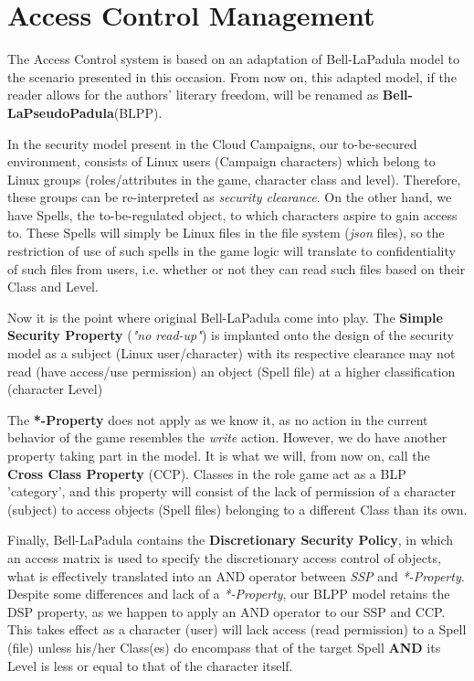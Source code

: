 \documentclass[a4paper,12pt]{report}
\begin{document}
\section{Access Control Management}
\label{sec:planACL}
The Access Control system is based on an adaptation of Bell-LaPadula model to the scenario presented in this occasion. From now on, this adapted model, if the reader allows for the authors' literary freedom, will be renamed as \textbf{Bell-LaPseudoPadula}(BLPP).

In the security model present in the Cloud Campaigns, our to-be-secured environment, consists of Linux users (Campaign characters) which belong to Linux groups (roles/attributes in the game, character class and level). Therefore, these groups can be re-interpreted as \textit{security clearance}.
On the other hand, we have Spells, the to-be-regulated object, to which characters aspire to gain access to. These Spells will simply be Linux files in the file system (\textit{json} files), so the restriction of use of such spells in the game logic will translate to confidentiality of such files from users, i.e. whether or not they can read such files based on their Class and Level.

Now it is the point where original Bell-LaPadula come into play. The \textbf{Simple Security Property} (\textit{"no read-up"}) is implanted onto the design of the security model as a subject (Linux user/character) with its respective clearance may not read (have access/use permission) an object (Spell file) at a higher classification (character Level)

The \textbf{*-Property} does not apply as we know it, as no action in the current behavior of the game resembles the \textit{write} action. However, we do have another property taking part in the model. It is what we will, from now on, call the \textbf{Cross Class Property} (CCP). Classes in the role game act as a BLP 'category', and this property will consist of the lack of permission of a character (subject) to access objects (Spell files) belonging to a different Class than its own.

Finally, Bell-LaPadula contains the \textbf{Discretionary Security Policy}, in which an access matrix is used to specify the discretionary access control of objects, what is effectively translated into an AND operator between \textit{SSP} and \textit{*-Property}. Despite some differences and lack of a \textit{*-Property}, our BLPP model retains the DSP property, as we happen to apply an AND operator to our SSP and CCP. This takes effect as a character (user) will lack access (read permission) to a Spell (file) unless his/her Class(es) do encompass that of the target Spell \textbf{AND} its Level is less or equal to that of the character itself.
\end{document}
